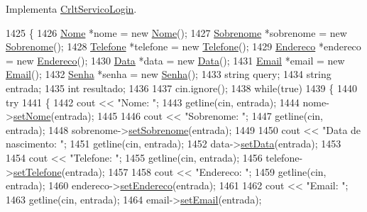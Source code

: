 Implementa \mbox{\hyperlink{class_crlt_servico_login_a49825818fa1e6e24495d6cb9e4236907}{Crlt\+Servico\+Login}}.


\begin{DoxyCode}
1425 \{
1426   \mbox{\hyperlink{class_nome}{Nome}} *nome = \textcolor{keyword}{new} \mbox{\hyperlink{class_nome}{Nome}}();
1427   \mbox{\hyperlink{class_sobrenome}{Sobrenome}} *sobrenome = \textcolor{keyword}{new} \mbox{\hyperlink{class_sobrenome}{Sobrenome}}();
1428   \mbox{\hyperlink{class_telefone}{Telefone}} *telefone = \textcolor{keyword}{new} \mbox{\hyperlink{class_telefone}{Telefone}}();
1429   \mbox{\hyperlink{class_endereco}{Endereco}} *endereco = \textcolor{keyword}{new} \mbox{\hyperlink{class_endereco}{Endereco}}();
1430   \mbox{\hyperlink{class_data}{Data}} *data = \textcolor{keyword}{new} \mbox{\hyperlink{class_data}{Data}}();
1431   \mbox{\hyperlink{class_email}{Email}} *email = \textcolor{keyword}{new} \mbox{\hyperlink{class_email}{Email}}();
1432   \mbox{\hyperlink{class_senha}{Senha}} *senha = \textcolor{keyword}{new} \mbox{\hyperlink{class_senha}{Senha}}();
1433   \textcolor{keywordtype}{string} query;
1434   \textcolor{keywordtype}{string} entrada;
1435   \textcolor{keywordtype}{int} resultado;
1436 
1437   cin.ignore();
1438   \textcolor{keywordflow}{while}(\textcolor{keyword}{true})
1439   \{
1440     \textcolor{keywordflow}{try}
1441     \{
1442       cout << \textcolor{stringliteral}{"Nome: "};
1443       getline(cin, entrada);
1444       nome->\mbox{\hyperlink{class_nome_a83b9f56ec9f86f4b976846f4c5c65b30}{setNome}}(entrada);
1445 
1446       cout << \textcolor{stringliteral}{"Sobrenome: "};
1447       getline(cin, entrada);
1448       sobrenome->\mbox{\hyperlink{class_sobrenome_a9dc2277e3600656838e47c86dfddd23a}{setSobrenome}}(entrada);
1449 
1450       cout << \textcolor{stringliteral}{"Data de nascimento: "};
1451       getline(cin, entrada);
1452       data->\mbox{\hyperlink{class_data_a5245638838a033c98a8b760836dddb7d}{setData}}(entrada);
1453 
1454       cout << \textcolor{stringliteral}{"Telefone: "};
1455       getline(cin, entrada);
1456       telefone->\mbox{\hyperlink{class_telefone_ad85910fc35320e4a8e7ede8d40bbc454}{setTelefone}}(entrada);
1457 
1458       cout << \textcolor{stringliteral}{"Endereco: "};
1459       getline(cin, entrada);
1460       endereco->\mbox{\hyperlink{class_endereco_a36e8c19c5e97f321d77aece5b3e53239}{setEndereco}}(entrada);
1461 
1462       cout << \textcolor{stringliteral}{"Email: "};
1463       getline(cin, entrada);
1464       email->\mbox{\hyperlink{class_email_a2614b3a19d961411d1bece9c1bdf616f}{setEmail}}(entrada);

\end{DoxyCode}
